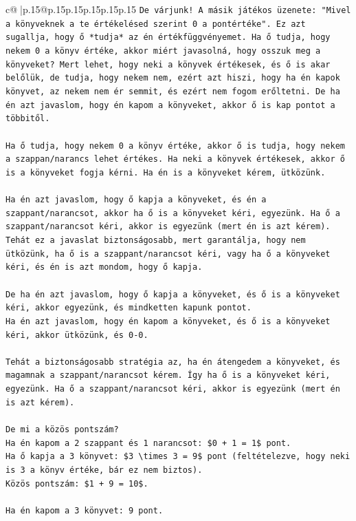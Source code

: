 \documentclass{article}
\begin{document}
{\begin{supertabular}{c@{$\;$}|p{.15\linewidth}@{}p{.15\linewidth}p{.15\linewidth}p{.15\linewidth}p{.15\linewidth}p{.15\linewidth}}
{{{\texttt{De várjunk! A másik játékos üzenete: "Mivel a könyveknek a te értékelésed szerint 0 a pontértéke". Ez azt sugallja, hogy ő *tudja* az én értékfüggvényemet. Ha ő tudja, hogy nekem 0 a könyv értéke, akkor miért javasolná, hogy osszuk meg a könyveket? Mert lehet, hogy neki a könyvek értékesek, és ő is akar belőlük, de tudja, hogy nekem nem, ezért azt hiszi, hogy ha én kapok könyvet, az nekem nem ér semmit, és ezért nem fogom erőltetni. De ha én azt javaslom, hogy én kapom a könyveket, akkor ő is kap pontot a többitől.} \\
\\ 
\texttt{Ha ő tudja, hogy nekem 0 a könyv értéke, akkor ő is tudja, hogy nekem a szappan/narancs lehet értékes. Ha neki a könyvek értékesek, akkor ő is a könyveket fogja kérni. Ha én is a könyveket kérem, ütközünk.} \\
\\ 
\texttt{Ha én azt javaslom, hogy ő kapja a könyveket, és én a szappant/narancsot, akkor ha ő is a könyveket kéri, egyezünk. Ha ő a szappant/narancsot kéri, akkor is egyezünk (mert én is azt kérem). Tehát ez a javaslat biztonságosabb, mert garantálja, hogy nem ütközünk, ha ő is a szappant/narancsot kéri, vagy ha ő a könyveket kéri, és én is azt mondom, hogy ő kapja.} \\
\\ 
\texttt{De ha én azt javaslom, hogy ő kapja a könyveket, és ő is a könyveket kéri, akkor egyezünk, és mindketten kapunk pontot.} \\
\texttt{Ha én azt javaslom, hogy én kapom a könyveket, és ő is a könyveket kéri, akkor ütközünk, és 0{-}0.} \\
\\ 
\texttt{Tehát a biztonságosabb stratégia az, ha én átengedem a könyveket, és magamnak a szappant/narancsot kérem. Így ha ő is a könyveket kéri, egyezünk. Ha ő a szappant/narancsot kéri, akkor is egyezünk (mert én is azt kérem).} \\
\\ 
\texttt{De mi a közös pontszám?} \\
\texttt{Ha én kapom a 2 szappant és 1 narancsot: \$0 + 1 = 1\$ pont.} \\
\texttt{Ha ő kapja a 3 könyvet: \$3 \textbackslash{}times 3 = 9\$ pont (feltételezve, hogy neki is 3 a könyv értéke, bár ez nem biztos).} \\
\texttt{Közös pontszám: \$1 + 9 = 10\$.} \\
\\ 
\texttt{Ha én kapom a 3 könyvet: 9 pont.} \\
}}}
\end{supertabular}}
\end{document}
